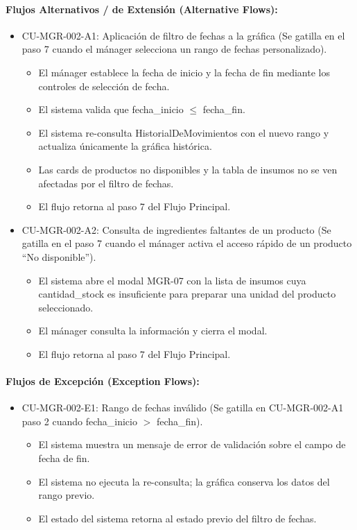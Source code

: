 \paragraph{Flujos Alternativos / de Extensión (Alternative Flows):}
\begin{itemize}
    \item CU-MGR-002-A1: Aplicación de filtro de fechas a la gráfica (Se gatilla en el paso 7 cuando el mánager selecciona un rango de fechas personalizado).
    \begin{itemize}
        \item El mánager establece la fecha de inicio y la fecha de fin mediante los controles de selección de fecha.
        \item El sistema valida que fecha\_inicio $\le$ fecha\_fin.
        \item El sistema re-consulta HistorialDeMovimientos con el nuevo rango y actualiza únicamente la gráfica histórica.
        \item Las cards de productos no disponibles y la tabla de insumos no se ven afectadas por el filtro de fechas.
        \item El flujo retorna al paso 7 del Flujo Principal.
    \end{itemize}
    \item CU-MGR-002-A2: Consulta de ingredientes faltantes de un producto (Se gatilla en el paso 7 cuando el mánager activa el acceso rápido de un producto ``No disponible'').
    \begin{itemize}
        \item El sistema abre el modal MGR-07 con la lista de insumos cuya cantidad\_stock es insuficiente para preparar una unidad del producto seleccionado.
        \item El mánager consulta la información y cierra el modal.
        \item El flujo retorna al paso 7 del Flujo Principal.
    \end{itemize}
\end{itemize}

\paragraph{Flujos de Excepción (Exception Flows):}
\begin{itemize}
    \item CU-MGR-002-E1: Rango de fechas inválido (Se gatilla en CU-MGR-002-A1 paso 2 cuando fecha\_inicio $>$ fecha\_fin).
    \begin{itemize}
        \item El sistema muestra un mensaje de error de validación sobre el campo de fecha de fin.
        \item El sistema no ejecuta la re-consulta; la gráfica conserva los datos del rango previo.
        \item El estado del sistema retorna al estado previo del filtro de fechas.
    \end{itemize}
\end{itemize}


